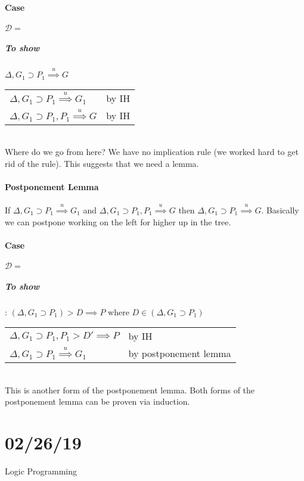 \documentclass[12 pt]{article}
\begin{document}
	\paragraph{Case} $\mathcal{D} = $
	\DP
	\subparagraph{To show} $\Delta, G_1 \supset P_1
\stackrel{u}{\implies} G$
	\\ \begin{tabular}{l l}
		$\Delta, G_1 \supset P_1 \stackrel{u}{\implies} G_1$ & by IH
		\\ $\Delta, G_1 \supset P_1, P_1 \stackrel{u}{\implies} G$ & by IH
	\end{tabular}
	\\ Where do we go from here? We have no implication rule (we
	worked hard to get rid of the rule). This suggests that we need
	a lemma.
	\paragraph{Postponement Lemma}
	If $\Delta, G_1 \supset P_1 \stackrel{u}{\implies}G_1$ and
$\Delta, G_1 \supset P_1, P_1 \stackrel{u}{\implies} G$ then
$\Delta, G_1 \supset P_1 \stackrel{u}{\implies} G$. Basically
	we can postpone working on the left for higher up in the tree.
	\paragraph{Case} $\mathcal{D} = $
	\DP
	\subparagraph{To show}: $(\Delta, G_1 \supset P_1) > D \implies
P$ where $D \in (\Delta, G_1 \supset P_1)$
	\\
	\begin{tabular}{l l}
		$\Delta, G_1 \supset P_1, P_1 > D' \implies P$ & by IH
		\\ $\Delta, G_1 \supset P_1 \stackrel{u}{\implies} G_1$ & by postponement lemma
	\end{tabular}
	\\ This is another form of the postponement lemma. Both forms
	of the postponement lemma can be proven via induction.
	\section{02/26/19}
	Logic Programming
\end{document}
